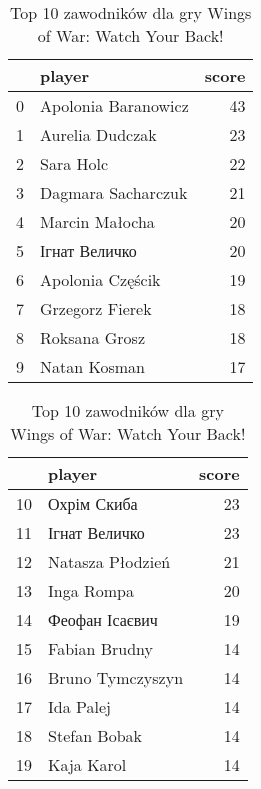 
\begin{table}[h]
\begin{minipage}{.5\linewidth}
\caption{Top 10 zawodników dla gry Indian Summer}\label{tab:top10_1}
\centering
\begin{tabular}{rlr}
\hline
    & player              &   score \\
\hline
  0 & Apolonia Baranowicz &      43 \\
  1 & Aurelia Dudczak     &      23 \\
  2 & Sara Holc           &      22 \\
  3 & Dagmara Sacharczuk  &      21 \\
  4 & Marcin Małocha      &      20 \\
  5 & Ігнат Величко       &      20 \\
  6 & Apolonia Częścik    &      19 \\
  7 & Grzegorz Fierek     &      18 \\
  8 & Roksana Grosz       &      18 \\
  9 & Natan Kosman        &      17 \\
\hline
\end{tabular}
\end{minipage}%
\begin{minipage}{.5\linewidth}
\centering
\caption{Top 10 zawodników dla gry Wings of War: Watch Your Back!}\label{tab:top10_2}
\begin{tabular}{rlr}
\hline
    & player           &   score \\
\hline
 10 & Охрім Скиба      &      23 \\
 11 & Ігнат Величко    &      23 \\
 12 & Natasza Płodzień &      21 \\
 13 & Inga Rompa       &      20 \\
 14 & Феофан Ісаєвич   &      19 \\
 15 & Fabian Brudny    &      14 \\
 16 & Bruno Tymczyszyn &      14 \\
 17 & Ida Palej        &      14 \\
 18 & Stefan Bobak     &      14 \\
 19 & Kaja Karol       &      14 \\
\hline
\end{tabular}
\end{minipage}%
\end{table}
